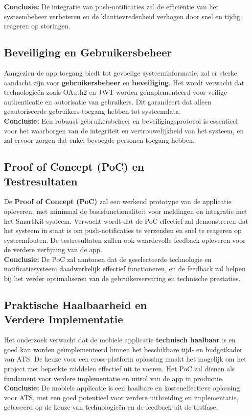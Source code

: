 \noindent \textbf{Conclusie:} De integratie van push-notificaties zal de efficiëntie van het systeembeheer verbeteren en de klanttevredenheid verhogen door snel en tijdig reageren op storingen.

\subsection{Beveiliging en Gebruikersbeheer}
\noindent Aangezien de app toegang biedt tot gevoelige systeeminformatie, zal er sterke aandacht zijn voor \textbf{gebruikersbeheer} en \textbf{beveiliging}. Het wordt verwacht dat technologieën zoals OAuth2 en JWT worden geïmplementeerd voor veilige authenticatie en autorisatie van gebruikers. Dit garandeert dat alleen geautoriseerde gebruikers toegang hebben tot systeemdata.\\


\noindent \textbf{Conclusie:} Een robuust gebruikersbeheer en beveiligingsprotocol is essentieel voor het waarborgen van de integriteit en vertrouwelijkheid van het systeem, en zal ervoor zorgen dat enkel bevoegde personen toegang hebben.

\subsection{Proof of Concept (PoC) en \\Testresultaten}
\noindent De \textbf{Proof of Concept (PoC)} zal een werkend prototype van de applicatie opleveren, met minimaal de basisfunctionaliteit voor meldingen en integratie met het SmartKit-systeem. Verwacht wordt dat de PoC effectief zal demonstreren dat het systeem in staat is om push-notificaties te verzenden en snel te reageren op systeemfouten. De testresultaten zullen ook waardevolle feedback opleveren voor de verdere verfijning van de app. \\


\noindent \textbf{Conclusie:} De PoC zal aantonen dat de geselecteerde technologie en notificatiesysteem daadwerkelijk effectief functioneren, en de feedback zal helpen bij het verder optimaliseren van de gebruikerservaring en technische prestaties.

\subsection{Praktische Haalbaarheid en \\Verdere Implementatie}
\noindent Het onderzoek verwacht dat de mobiele applicatie \textbf{technisch haalbaar} is en goed kan worden geïmplementeerd binnen het beschikbare tijd- en budgetkader van ATS. De keuze voor een cross-platform oplossing maakt het mogelijk om het project met beperkte middelen effectief uit te voeren. Het PoC zal dienen als fundament voor verdere implementatie en uitrol van de app in productie. \\


\noindent \textbf{Conclusie:} De mobiele applicatie is een haalbare en kosteneffectieve oplossing voor ATS, met een goed potentieel voor verdere uitbreiding en implementatie, gebaseerd op de keuze van technologieën en de feedback uit de testfase.


